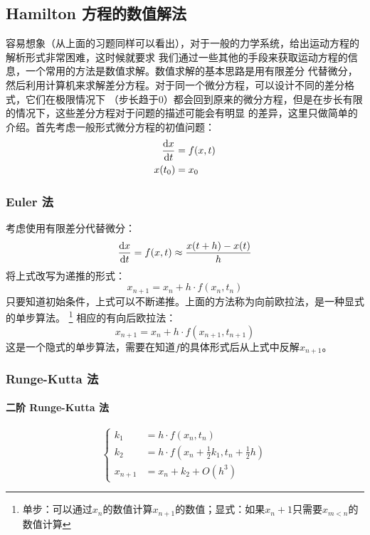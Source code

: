     \subsection{Hamilton 方程的数值解法}
    容易想象（从上面的习题同样可以看出），对于一般的力学系统，给出运动方程的解析形式非常困难，这时候就要求
    我们通过一些其他的手段来获取运动方程的信息，一个常用的方法是数值求解。数值求解的基本思路是用有限差分
    代替微分，然后利用计算机来求解差分方程。对于同一个微分方程，可以设计不同的差分格式，它们在极限情况下
    （步长趋于0）都会回到原来的微分方程，但是在步长有限的情况下，这些差分方程对于问题的描述可能会有明显
    的差异，这里只做简单的介绍。首先考虑一般形式微分方程的初值问题：
    \begin{equation}
        \begin{split}
            \frac{\mathrm{d}{x}}{\mathrm{d}{t}} &= f(x, t) \\
            x(t_0) &= x_0
        \end{split}
    \end{equation}
    \subsubsection{Euler 法}
    考虑使用有限差分代替微分：
    \begin{equation}
        \frac{\mathrm{d}{x}}{\mathrm{d}{t}} = f(x, t) \approx \frac{x(t + h) - x(t)}{h}
    \end{equation}
    将上式改写为递推的形式：
    \begin{equation}
        x_{n+1} = x_n + h\cdot f(x_n, t_n)
    \end{equation}
    只要知道初始条件，上式可以不断递推。上面的方法称为向前欧拉法，是一种显式的单步算法。
    \footnote{
        单步：可以通过$x_n$的数值计算$x_{n+1}$的数值；显式：如果$x_n+1$只需要$x_{m<n}$的数值计算
    }
    相应的有向后欧拉法：
    \begin{equation}
        x_{n+1} = x_n + h\cdot f(x_{n+1}, t_{n+1})
    \end{equation}
    这是一个隐式的单步算法，需要在知道$f$的具体形式后从上式中反解$x_{n+1}$。
    \subsubsection{Runge-Kutta 法}
    \paragraph{二阶 Runge-Kutta 法}
    \begin{equation}
        \left\{
            \begin{split}
                k_1 &= h\cdot f(x_n, t_n)\\
                k_2 &= h\cdot f(x_n + \frac{1}{2}k_1, t_n + \frac{1}{2}h)\\
                x_{n+1} &= x_n + k_2 + O(h^3)
            \end{split}
        \right.
    \end{equation}
